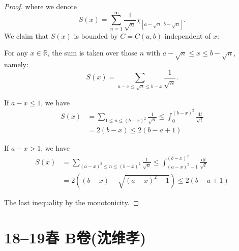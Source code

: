 \begin{itemize}
\begin{proof}
	where we denote
    \[S( x ) =\sum_{n=1}^{\infty}{\frac{1}{\sqrt{n}}\chi _{\left[ a-\sqrt{n},b-\sqrt{n} \right]}}.\] 
    We claim that $ S(x) $ is bounded by $ C=C(a,b) $ independent of $ x $:
	
	For any $ x\in \mathbb{R}  $, the sum is taken over those $ n $ with $ a-\sqrt{n}\le x\le b-\sqrt{n} $, namely:
    $$
	S( x ) =\sum_{a-x\le \sqrt{n}\le b-x}^{}{\frac{1}{\sqrt{n}}}.
	$$
	
	If $ a-x\le 1 $, we have
	\begin{align*}
	S( x ) &=\sum_{1\le n\le \left( b-x \right) ^2}{\frac{1}{\sqrt{n}}}
    \le \int_0^{( b-x ) ^2}{\frac{\mathrm{d} t}{\sqrt{t}}}\\
    &=2( b-x ) \le 2( b-a+1 ) 
	\end{align*}
	
	If $ a-x>1 $, we have
	\begin{align*}
	S( x ) &=\sum_{( a-x ) ^2\le n\le ( b-x ) ^2}^{}{\frac{1}{\sqrt{n}}}
    \le \int_{( a-x ) ^2-1}^{( b-x ) ^2}{\frac{\mathrm{d} t}{\sqrt{t}}}\\
	&=2\left( ( b-x ) -\sqrt{( a-x ) ^2-1} \right) \le 2( b-a+1 ) 
	\end{align*}
	
	The last inequality by the monotonicity.
\end{proof}
\end{itemize}

\section{18--19春 B卷(沈维孝)}

